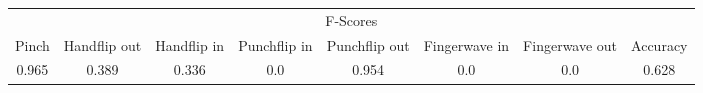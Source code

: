 \documentclass{standalone}
\begin{document}
 
 \begin{tabular}{|c|c|c|c|c|c|c ||c|}
\cline{1-8}\multicolumn{8}{|c|}{F-Scores} \\ 
\cline{1-8}Pinch & Handflip out & Handflip in & Punchflip in & Punchflip out & Fingerwave in & Fingerwave out & Accuracy\\ 
\cline{1-8}0.965 & 0.389 & 0.336 & 0.0 & 0.954 & 0.0 & 0.0 & 0.628\\ 
 \cline{1-8}\hline \end{tabular}
 
\end{document}
